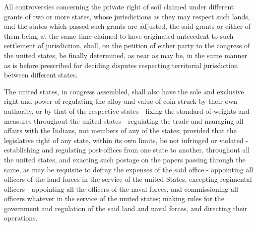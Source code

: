 All controversies concerning the private right of soil claimed under different grants of two or more states, whose jurisdictions as they may respect such lands, and the states which passed such grants are adjusted, the said grants or either of them being at the same time claimed to have originated antecedent to such settlement of jurisdiction, shall, on the petition of either party to the congress of the united states, be finally determined, as near as may be, in the same manner as is before prescribed for deciding disputes respecting territorial jurisdiction between different states.

The united states, in congress assembled, shall also have the sole and exclusive right and power of regulating the alloy and value of coin struck by their own authority, or by that of the respective states - fixing the standard of weights and measures throughout the united states - regulating the trade and managing all affairs with the Indians, not members of any of the states; provided that the legislative right of any state, within its own limits, be not infringed or violated - establishing and regulating post-offices from one state to another, throughout all the united states, and exacting such postage on the papers passing through the same, as may be requisite to defray the expenses of the said office - appointing all officers of the land forces in the service of the united States, excepting regimental officers - appointing all the officers of the naval forces, and commissioning all officers whatever in the service of the united states; making rules for the government and regulation of the said land and naval forces, and directing their operations.

